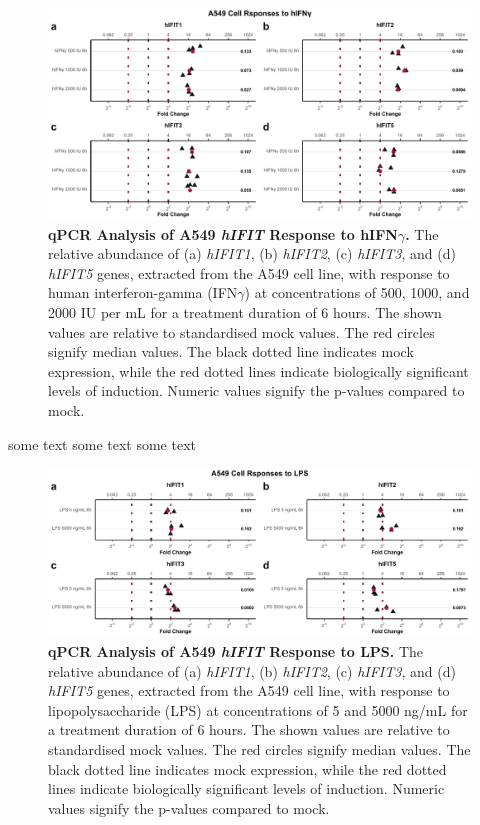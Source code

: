 \begin{figure}
    \centering
    \includegraphics[width=1\linewidth]{06. Chapter 1/Figs/01. Induction/02. a549_treat_ifng.pdf}
    \caption[qPCR Analysis of A549 \textit{hIFIT} Response to hIFN\(\gamma\).]{\textbf{qPCR Analysis of A549 \textit{hIFIT} Response to hIFN\(\gamma\).} The relative abundance of (a) \textit{hIFIT1}, (b) \textit{hIFIT2}, (c) \textit{hIFIT3}, and (d) \textit{hIFIT5} genes, extracted from the A549 cell line, with response to human interferon-gamma (IFN\(\gamma\)) at concentrations of 500, 1000, and 2000 IU per mL for a treatment duration of 6 hours. The shown values are relative to standardised mock values. The red circles signify median values. The black dotted line indicates mock expression, while the red dotted lines indicate biologically significant levels of induction. Numeric values signify the p-values compared to mock.}
    \label{A549 Response to hIFNg}
\end{figure}

some text some text some text


\begin{figure}
    \centering
    \includegraphics[width=1\linewidth]{06. Chapter 1/Figs/01. Induction/03. a549_treat_lps.pdf}
    \caption[qPCR Analysis of A549 \textit{hIFIT} Response to LPS.]{\textbf{qPCR Analysis of A549 \textit{hIFIT} Response to LPS.} The relative abundance of (a) \textit{hIFIT1}, (b) \textit{hIFIT2}, (c) \textit{hIFIT3}, and (d) \textit{hIFIT5} genes, extracted from the A549 cell line, with response to lipopolysaccharide (LPS) at concentrations of 5 and 5000 ng/mL for a treatment duration of 6 hours. The shown values are relative to standardised mock values. The red circles signify median values. The black dotted line indicates mock expression, while the red dotted lines indicate biologically significant levels of induction. Numeric values signify the p-values compared to mock.}
    \label{A549 Response to LPS}
\end{figure}

